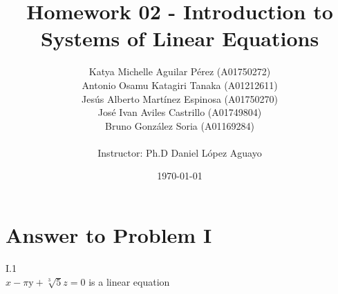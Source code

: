 \documentclass[11pt,a4paper]{article}
\title
{
    Homework 02 - Introduction to Systems of Linear Equations
}
\author
{    
    Katya Michelle Aguilar P{\' e}rez (A01750272) \\
    Antonio Osamu Katagiri Tanaka (A01212611) \\
    Jes{\' u}s Alberto Mart{\' i}nez Espinosa (A01750270) \\
    Jos{\' e} Ivan Aviles Castrillo (A01749804) \\
    Bruno Gonz{\' a}lez Soria (A01169284)  \\
    \\
    Instructor: Ph.D Daniel L{\' o}pez Aguayo
}
\date{\today}
\providecommand{\keywords}[1]
{
    \\
    \\
    \small
    \textbf{\textit{Keywords:}} #1
}
\begin{document}
\setlength\parindent{0pt} %


\maketitle


\clearpage








\section{Answer to Problem I}\label{sec:P01}

I.1\\
\(x-\text{$\pi $y}+\sqrt[3]{5}z=0\) is a linear equation\\
\end{document}
